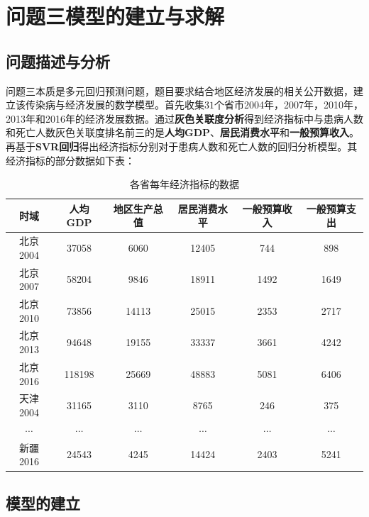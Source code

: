 \documentclass{whutmod}
\begin{document}
  
  \section{问题三模型的建立与求解}
  \subsection{问题描述与分析}
  
  问题三本质是多元回归预测问题，题目要求结合地区经济发展的相关公开数据，建立该传染病与经济发展的数学模型。首先收集$31$个省市2004年，2007年，2010年，2013年和2016年的经济发展数据。通过\textbf{灰色关联度分析}得到经济指标中与患病人数和死亡人数灰色关联度排名前三的是\textbf{人均GDP}、\textbf{居民消费水平}和\textbf{一般预算收入}。再基于\textbf{SVR回归}得出经济指标分别对于患病人数和死亡人数的回归分析模型。其经济指标的部分数据如下表：
  
  \begin{table}[H]
  	\centering\caption{各省每年经济指标的数据}\label{s2ss}
  	\begin{tabular}{cccccc}
  		\toprule[1.5pt]
  		\multicolumn{1}{m{1.8cm}}{\centering 时域
  		}
  		& \multicolumn{1}{m{1.8cm}}{\centering 人均GDP}
  		& \multicolumn{1}{m{1.8cm}}{\centering 地区生产总值}
  		& \multicolumn{1}{m{1.8cm}}{\centering 居民消费水平
  		}
  		& \multicolumn{1}{m{1.8cm}}{\centering 一般预算收入
  		}
  		& \multicolumn{1}{m{1.8cm}}{\centering 一般预算支出
  		}
  		
  		\\
  		\midrule[0.5pt]	
  		北京2004 & 37058 &6060&12405&744&898
  		\\ 
  		北京2007 & 58204&9846&18911&1492&1649\\
  		北京2010 &73856 &14113&25015&2353&2717\\
  		北京2013 & 94648&19155&33337&3661&4242\\
  		北京2016 & 118198&25669&48883&5081&6406\\
  		天津2004 &31165 &3110&8765&246&375\\
  		$\cdots$ &$\cdots$ &$\cdots$&$\cdots$&$\cdots$&$\cdots$\\
  		新疆2016 &24543 &4245&14424&2403&5241\\
  		\bottomrule[1.5pt]	
  	\end{tabular}
  \end{table}
  
  
  \subsection{模型的建立}
\end{document}

